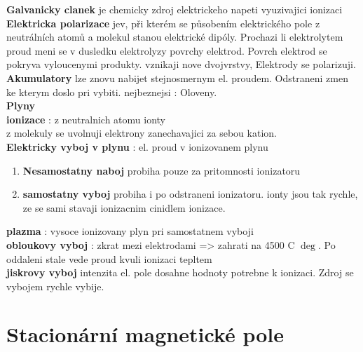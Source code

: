 \documentclass{report}
\begin{document}
\textbf{Galvanicky clanek} je chemicky zdroj elektrickeho napeti vyuzivajici ionizaci
\textbf{Elektricka polarizace}  jev, při kterém se působením elektrického pole z neutrálních atomů a molekul stanou elektrické dipóly. Prochazi li elektrolytem proud meni se v dusledku elektrolyzy povrchy elektrod. Povrch elektrod se pokryva vyloucenymi produkty. vznikaji nove dvojvrstvy, Elektrody se polarizuji.  \\
\textbf{Akumulatory} lze znovu nabijet stejnosmernym el. proudem. Odstraneni zmen ke kterym doslo pri vybiti. nejbeznejsi : Oloveny. \\

\textbf{Plyny} \\

\textbf{ionizace} : z neutralnich atomu ionty \\
z molekuly se uvolnuji elektrony zanechavajici za sebou kation. \\
\textbf{Elektricky vyboj v plynu} : el. proud v ionizovanem plynu \\
\begin{enumerate}[label=\bfseries\tiny\protect\circled{\small\arabic*}]
  \item  \textbf{Nesamostatny naboj} probiha pouze za pritomnosti ionizatoru
  \item  \textbf{samostatny vyboj} probiha i po odstraneni ionizatoru. ionty jsou tak rychle, ze se sami stavaji ionizacnim cinidlem ionizace. 
\end{enumerate}

\textbf{plazma} : vysoce ionizovany plyn pri samostatnem vyboji \\
\textbf{obloukovy vyboj} : zkrat mezi elektrodami => zahrati na 4500 C $\deg$. Po oddaleni stale vede proud kvuli ionizaci tepltem \\
\textbf{jiskrovy vyboj} intenzita el. pole dosahne hodnoty potrebne k ionizaci. Zdroj se vybojem rychle vybije. \\
\newpage


\section{Stacionární magnetické pole}
\newpage
\end{document}

